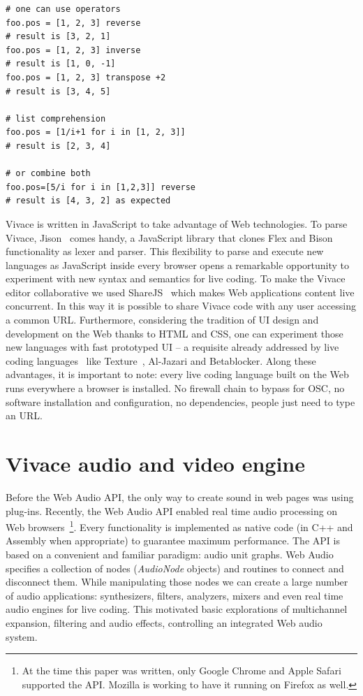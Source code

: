\documentclass[12pt,times,twocolumn]{article}
\begin{document}
\begin{Verbatim}[fontfamily=courier, xleftmargin=\parindent,fontsize=\footnotesize]
# one can use operators
foo.pos = [1, 2, 3] reverse
# result is [3, 2, 1]
foo.pos = [1, 2, 3] inverse 
# result is [1, 0, -1]
foo.pos = [1, 2, 3] transpose +2   
# result is [3, 4, 5]

# list comprehension
foo.pos = [1/i+1 for i in [1, 2, 3]] 
# result is [2, 3, 4]

# or combine both
foo.pos=[5/i for i in [1,2,3]] reverse 
# result is [4, 3, 2] as expected
\end{Verbatim}

Vivace is written in JavaScript to take advantage of Web technologies.
To parse Vivace, Jison~\cite{jison} comes handy, a JavaScript
library that clones Flex and Bison functionality as lexer and
parser. This flexibility to parse and execute new languages as
JavaScript inside every browser opens a remarkable opportunity to
experiment with new syntax and semantics for live coding. To make the
Vivace editor collaborative we used ShareJS~\cite{sharejs} which makes
Web applications content live concurrent. In this way it is possible
to share Vivace code with any user accessing a common
URL. Furthermore, considering the tradition of UI design and
development on the Web thanks to HTML and CSS, one can experiment
those new languages with fast prototyped UI -- a requisite already
addressed by live coding languages~\cite{mclean2010visualisation,
  magnusson2011algorithms} like Texture~\cite{mclean2011texture},
Al-Jazari and Betablocker. Along these advantages, it is important to
note: every live coding language built on the Web runs everywhere a
browser is installed. No firewall chain to bypass for OSC, no software
installation and configuration, no dependencies, people just need to
type an URL.

\section{Vivace audio and video engine}
Before the Web Audio API, the only way to create sound in web pages
was using plug-ins. Recently, the Web Audio API enabled real time
audio processing on Web browsers~\footnote{At the time this paper was
  written, only Google Chrome and Apple Safari supported the
  API. Mozilla is working to have it running on Firefox as
  well.}. Every functionality is implemented as native code (in C++
and Assembly when appropriate) to guarantee maximum performance. The
API is based on a convenient and familiar paradigm: audio unit
graphs. Web Audio specifies a collection of nodes (\emph{AudioNode}
objects) and routines to connect and disconnect them. While
manipulating those nodes we can create a large number of audio
applications: synthesizers, filters, analyzers, mixers and even real
time audio engines for live coding. This motivated basic explorations
of multichannel expansion, filtering and audio effects, controlling an
integrated Web audio system.
\end{document}
